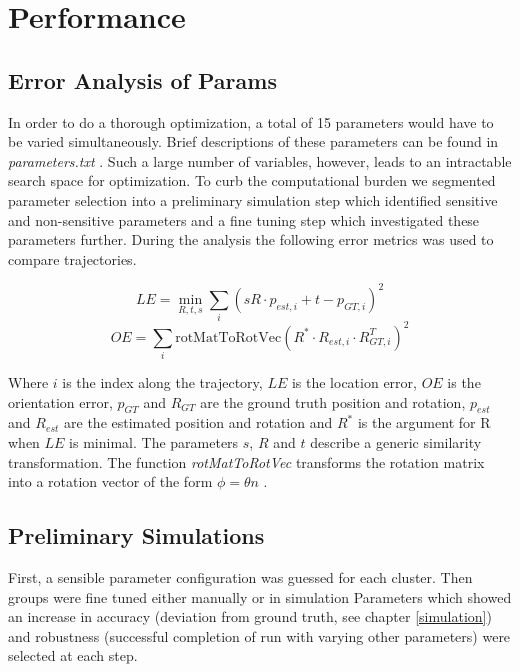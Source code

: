 \chapter{Performance}
\label{performance}

\section{Error Analysis of Params}

In order to do a thorough optimization, a total of 15 parameters would have to be varied simultaneously. 
Brief descriptions of these parameters can be found in \emph{parameters.txt} .
Such a large number of variables, however, leads to an intractable search space for optimization. 
To curb the computational burden we segmented parameter selection into a preliminary simulation step  which identified sensitive and non-sensitive parameters and a fine tuning step which investigated these parameters further. 
During the analysis the following error metrics was used to compare trajectories.

\begin{equation*}LE = \underset{R,t,s}{\min} \sum_i (s R \cdot p_{est, i} + t - p_{GT, i})^2\end{equation*}
\begin{equation*}OE = \sum_i \text{rotMatToRotVec}(R^* \cdot R_{est,i} \cdot R_{GT, i}^T)^2\end{equation*}

Where $i$ is the index along the trajectory, $LE$ is the location error, $OE$ is the orientation error, $p_{GT}$ and $R_{GT}$ are the ground truth position and rotation, $p_{est}$ and $R_{est}$ are the estimated position and rotation and $R^*$ is the argument for R when $LE$ is minimal. 
The parameters $s$, $R$ and $t$ describe a generic similarity transformation. 
The function \emph{rotMatToRotVec} transforms the rotation matrix into a rotation vector of the form $\phi = \theta n$ .

\section{Preliminary Simulations}

First, a sensible parameter configuration was guessed for each cluster. 
Then groups were fine tuned either manually or in simulation  
Parameters which showed an increase in accuracy (deviation from ground truth, see chapter \ref{simulation}) and robustness (successful completion of run with varying other parameters) were selected at each step.

